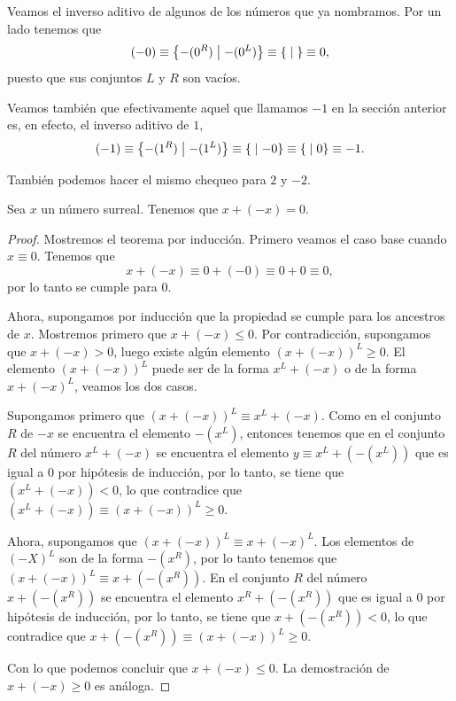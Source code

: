     \begin{example}
        Veamos el inverso aditivo de algunos de los n\'umeros que ya nombramos. Por un lado tenemos que
        \[
            (-0) \equiv \left\{-(0^R)\;\middle|\; -(0^L)\right\} \equiv \left\{\;\middle|\; \right\} \equiv 0,
        \]
        puesto que sus conjuntos $L$ y $R$ son vac\'ios.

        Veamos tambi\'en que efectivamente aquel que llamamos $-1$ en la secci\'on anterior es, en efecto, el inverso aditivo de $1$,
        \[
            (-1) \equiv \left\{-(1^R)\;\middle|\; -(1^L)\right\} \equiv \left\{\;\middle|\; -0\right\} \equiv \left\{\;\middle|\; 0\right\} \equiv -1.     
        \]

        Tambi\'en podemos hacer el mismo chequeo para $2$ y $-2$.
    \end{example}

    \begin{theorem}
        Sea $x$ un n\'umero surreal. Tenemos que $x+(-x)=0$.
    \end{theorem}

    \begin{proof}
        Mostremos el teorema por inducci\'on. Primero veamos el caso base cuando $x\equiv 0$. Tenemos que
        \[
            x + (-x) \equiv 0 + (-0) \equiv 0+0 \equiv 0,
        \]
        por lo tanto se cumple para $0$.

        Ahora, supongamos por inducci\'on que la propiedad se cumple para los ancestros de $x$. Mostremos primero que $x + (-x) \le 0$. Por contradicci\'on, supongamos que $x + (-x) > 0$, luego existe alg\'un elemento $(x + (-x))^L \ge 0$. El elemento $(x + (-x))^L$ puede ser de la forma $x^L + (-x)$ o de la forma $x + (-x)^L$, veamos los dos casos.

        Supongamos primero que $(x + (-x))^L \equiv x^L + (-x)$. Como en el conjunto $R$ de $-x$ se encuentra el elemento $-(x^L)$, entonces tenemos que en el conjunto $R$ del n\'umero $x^L + (-x)$ se encuentra el elemento $y \equiv x^L + (-(x^L))$ que es igual a $0$ por hip\'otesis de inducci\'on, por lo tanto, se tiene que $(x^L + (-x)) < 0$, lo que contradice que $(x^L + (-x))\equiv (x + (-x))^L \ge 0$.

        Ahora, supongamos que $(x + (-x))^L \equiv x + (-x)^L$. Los elementos de $(-X)^L$ son de la forma $-(x^R)$, por lo tanto tenemos que $(x + (-x))^L\equiv x + (-(x^R))$. En el conjunto $R$ del n\'umero $x + (-(x^R))$ se encuentra el elemento $x^R + (-(x^R))$ que es igual a $0$ por hip\'otesis de inducci\'on, por lo tanto, se tiene que $x + (-(x^R)) < 0$, lo que contradice que $x + (-(x^R))\equiv (x + (-x))^L \ge 0$.

        Con lo que podemos concluir que $x + (-x) \le 0$. La demostraci\'on de $x+(-x) \ge 0$ es an\'aloga.
    \end{proof}



